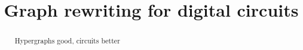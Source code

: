 








\title{Graph rewriting for digital circuits}





    \maketitle

    \begin{abstract}
        Hypergraphs good, circuits better
    \end{abstract}

    

    

